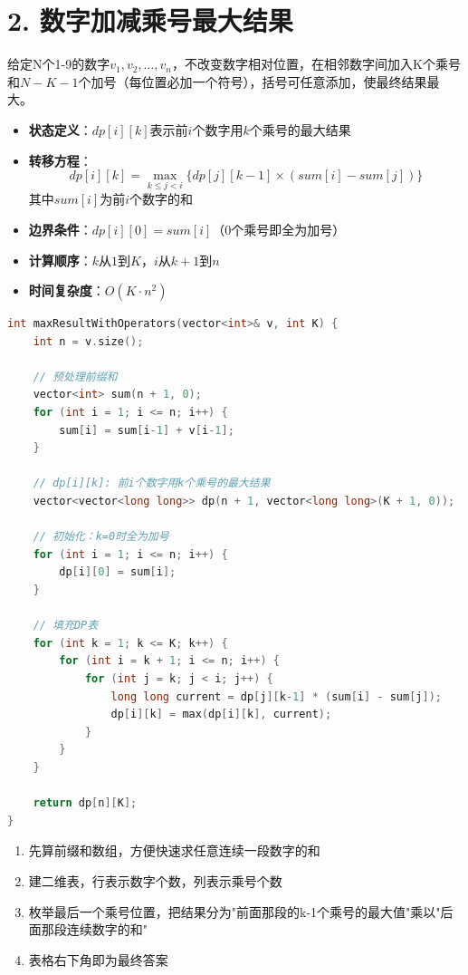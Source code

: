 \section*{2. 数字加减乘号最大结果}

给定N个1-9的数字$v_1, v_2, \ldots, v_n$，不改变数字相对位置，在相邻数字间加入K个乘号和$N-K-1$个加号（每位置必加一个符号），括号可任意添加，使最终结果最大。

\begin{itemize}
    \item \textbf{状态定义}：$dp[i][k]$表示前$i$个数字用$k$个乘号的最大结果
    \item \textbf{转移方程}：$$dp[i][k] = \max_{k \le j < i} \{dp[j][k-1] \times (sum[i] - sum[j])\}$$其中$sum[i]$为前$i$个数字的和
    \item \textbf{边界条件}：$dp[i][0] = sum[i]$（0个乘号即全为加号）
    \item \textbf{计算顺序}：$k$从$1$到$K$，$i$从$k+1$到$n$
    \item \textbf{时间复杂度}：$O(K \cdot n^2)$
\end{itemize}


\begin{lstlisting}[language=C++, style=cppstyle]
int maxResultWithOperators(vector<int>& v, int K) {
    int n = v.size();

    // 预处理前缀和
    vector<int> sum(n + 1, 0);
    for (int i = 1; i <= n; i++) {
        sum[i] = sum[i-1] + v[i-1];
    }

    // dp[i][k]: 前i个数字用k个乘号的最大结果
    vector<vector<long long>> dp(n + 1, vector<long long>(K + 1, 0));

    // 初始化：k=0时全为加号
    for (int i = 1; i <= n; i++) {
        dp[i][0] = sum[i];
    }

    // 填充DP表
    for (int k = 1; k <= K; k++) {
        for (int i = k + 1; i <= n; i++) {
            for (int j = k; j < i; j++) {
                long long current = dp[j][k-1] * (sum[i] - sum[j]);
                dp[i][k] = max(dp[i][k], current);
            }
        }
    }

    return dp[n][K];
}
\end{lstlisting}

\begin{enumerate}
    \item 先算前缀和数组，方便快速求任意连续一段数字的和
    \item 建二维表，行表示数字个数，列表示乘号个数
    \item 枚举最后一个乘号位置，把结果分为"前面那段的k-1个乘号的最大值"乘以"后面那段连续数字的和"
    \item 表格右下角即为最终答案
\end{enumerate}
